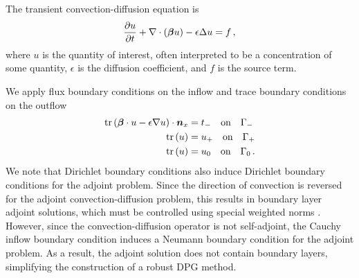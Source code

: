 \documentclass{article}
\theoremstyle{definition}
\theoremstyle{remark}
\begin{document}
The transient convection-diffusion equation is
\begin{equation*}
\frac{\partial u}{\partial t}+\nabla\cdot(\boldsymbol\beta u)-\epsilon\Delta u=f\,,
\end{equation*}
where $u$ is the quantity of interest, often interpreted to be a concentration of some quantity,
$\epsilon$ is the  diffusion coefficient, and $f$ is the source term.

We apply flux boundary conditions on the inflow and trace boundary conditions on the outflow
\begin{align*}
\operatorname*{tr}\left( \boldsymbol\beta\cdot u-\epsilon\nabla u \right)\cdot\boldsymbol n_x&=t_-\quad\text{on}\quad\Gamma_-\\
\operatorname*{tr}\left( u \right)&=u_+\quad\text{on}\quad\Gamma_+\\
\operatorname*{tr}\left( u \right)&=u_0\quad\text{on}\quad\Gamma_0\,.
\end{align*}
We note that Dirichlet boundary conditions also induce Dirichlet boundary conditions for the adjoint problem.  
Since the direction of convection is reversed for the adjoint convection-diffusion problem, 
this results in boundary layer adjoint solutions, which must be controlled using special weighted norms \cite{RoosStynesTobiska08,DemkowiczHeuer}.
However, since the convection-diffusion operator is not self-adjoint, the Cauchy inflow boundary condition induces a Neumann boundary condition for the adjoint problem.  As a result, the adjoint solution does not contain boundary layers, simplifying the construction of a robust DPG method.
\end{document}
